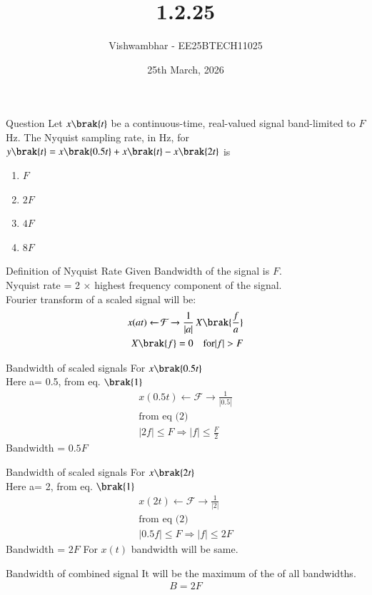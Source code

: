 \documentclass{beamer}
\title{1.2.25}
\date{25th March, 2026}
\author{Vishwambhar - EE25BTECH11025}
\begin{document}
\frame{\titlepage}
\begin{frame}{Question}
Let $x\brak{t}$ be a continuous-time, real-valued signal band-limited to $F$ Hz. The Nyquist sampling rate, in Hz, for $y\brak{t}=x\brak{0.5t}+x\brak{t}-x\brak{2t}$ is
\begin{enumerate}
    \item $F$
    \item $2F$
    \item $4F$
    \item $8F$
\end{enumerate}
\end{frame}

\begin{frame}{Definition of Nyquist Rate}
Given Bandwidth of the signal is $F$.\\
Nyquist rate = 2 × highest frequency component of the signal.\\
Fourier transform of a scaled signal will be:
\begin{align}
x(at)\xleftarrow{}\mathcal{F}\xrightarrow{} \frac{1}{|a|} \, X\brak{\frac{f}{a}}\\
X\brak{f}=0 \quad\text{for} |f|>F
\end{align}
\end{frame}

\begin{frame}{Bandwidth of scaled signals}
For $x\brak{0.5t}$\\
Here a= 0.5, from eq. $\brak{1}$
\begin{align}
    x(0.5t)\xleftarrow{}\mathcal{F}\xrightarrow{} \frac{1}{|0.5|} \\
    \text{from eq (2)}\\
    |2f|\leq F\Rightarrow|f|\leq \frac{F}{2}
\end{align}
Bandwidth = $0.5F$
\end{frame}

\begin{frame}{Bandwidth of scaled signals}
For $x\brak{2t}$\\
Here a= 2, from eq. $\brak{1}$
\begin{align}
    x(2t)\xleftarrow{}\mathcal{F}\xrightarrow{} \frac{1}{|2|} \\
    \text{from eq (2)}\\
    |0.5f|\leq F\Rightarrow|f|\leq 2F
\end{align}
Bandwidth = $2F$
For $x(t)$ bandwidth will be same.
\end{frame}


\begin{frame}{Bandwidth of combined signal}
It will be the maximum of the of all bandwidths.
\begin{align}
B=2F
\end{align}
\end{frame}
\end{document}
